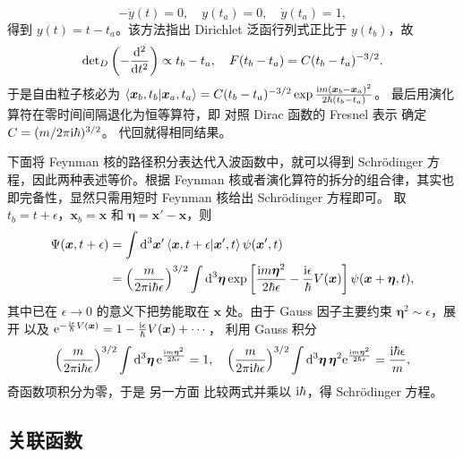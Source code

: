 \[
    -\ddot y(t)=0,\quad y(t_a)=0,\quad \dot y(t_a)=1,
\]
得到 $y(t)=t-t_a$。该方法指出 Dirichlet 泛函行列式正比于 $y(t_b)$，故
\[
    \det\nolimits_D\left(-\dv[2]{}{t}\right)\propto t_b-t_a,\quad
    F(t_b-t_a)=C (t_b-t_a)^{-3/2}.
\]
于是自由粒子核必为 $\ip{\bm x_b,t_b}{\bm x_a,t_a}
    =C (t_b-t_a)^{-3/2}
    \exp\frac{\i m(\bm x_b-\bm x_a)^2}{2\hbar (t_b-t_a)}$。
最后用演化算符在零时间间隔退化为恒等算符，即
对照 Dirac 函数的 Fresnel 表示
确定 $C=(m/2\pi\mathrm{i}\hbar)^{3/2}$。
代回就得相同结果。

下面将 Feynman 核的路径积分表达代入波函数中，就可以得到 Schr\"odinger 方程，因此两种表述等价。根据 Feynman 核或者演化算符的拆分的组合律，其实也即完备性，显然只需用短时 Feynman 核给出 Schr\"odinger 方程即可。
取 $t_b=t+\epsilon$，$\bm x_b=\bm x$ 和 $\bm\eta=\bm x'-\bm x$，则
\begin{align*}
    \Psi(\bm x,t+\epsilon)
    &=
    \int\d[3]{\bm x'}\ip{\bm x,t+\epsilon}{\bm x',t}\psi(\bm x',t)\\
    &=
    \left(\frac{m}{2\pi\i\hbar\epsilon}\right)^{3/2}
    \int\d[3]{\bm\eta}
    \exp\left[
        \frac{\i m\bm\eta^2}{2\hbar\epsilon}
        -\frac{\i\epsilon}{\hbar}V(\bm x)
    \right]
    \psi(\bm x+\bm\eta,t),
\end{align*}
其中已在 $\epsilon\to0$ 的意义下把势能取在 $\bm x$ 处。由于 Gauss 因子主要约束 $\bm\eta^2\sim \epsilon$，展开
以及 $\mathrm{e}^{-\frac{\mathrm{i}\epsilon}{\hbar}V(\bm x)}
    =
    1-\frac{\mathrm{i}\epsilon}{\hbar}V(\bm x)+\cdots$，
利用 Gauss 积分
\[
    \left(\frac{m}{2\pi\mathrm{i}\hbar\epsilon}\right)^{3/2}
    \int\dd[3]{\bm\eta} 
    \mathrm{e}^{\frac{\mathrm{i} m\bm\eta^2}{2\hbar\epsilon}}=1,\quad
    \left(\frac{m}{2\pi\mathrm{i}\hbar\epsilon}\right)^{3/2}
    \int\dd[3]{\bm\eta} 
    \bm\eta^2
    \mathrm{e}^{\frac{\mathrm{i} m\bm\eta^2}{2\hbar\epsilon}}
    =
    \frac{\mathrm{i}\hbar\epsilon}{m},
\]
奇函数项积分为零，于是
另一方面
比较两式并乘以 $\mathrm{i}\hbar$，得 Schr\"odinger 方程。

\subsection{关联函数}

